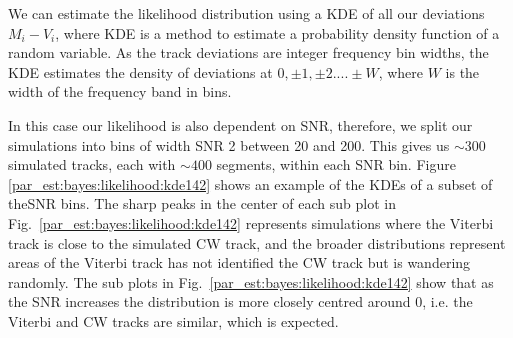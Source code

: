 We can estimate the likelihood distribution using a \gls{KDE}
of all our deviations $M_i - V_i$, where \gls{KDE} is a method to estimate a probability density function of a random variable.
As the track deviations are integer frequency bin widths, the \gls{KDE} estimates the density of deviations at $0, \pm 1, \pm 2 .... \pm W$, where $W$ is the width of the frequency band in bins.

In this case our likelihood is also dependent on \gls{SNR},
therefore, we split our simulations into bins of width \gls{SNR}
2 between 20 and 200. This gives us $\sim 300$
simulated tracks, each with $\sim 400$ segments, within each \gls{SNR} bin.  Figure
\ref{par_est:bayes:likelihood:kde142} shows an example of the \glspl{KDE} of a
subset of the\gls{SNR} bins. The sharp peaks in the center of
each sub plot in Fig.~\ref{par_est:bayes:likelihood:kde142} represents
simulations where the Viterbi track is close to the simulated \gls{CW} track,
and the broader distributions represent areas of the Viterbi track has not
identified the \gls{CW} track but is wandering randomly.  The sub plots in
Fig.~\ref{par_est:bayes:likelihood:kde142} show that as the \gls{SNR} increases
the distribution is more closely centred around 0, i.e. the Viterbi and
\gls{CW} tracks are similar, which is expected.


